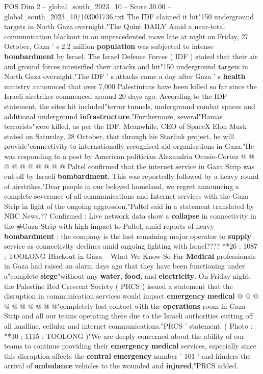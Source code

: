 \begin{textsample}{POS Dim 2 – global\_south\_2023\_10 – Score 30.00 – global\_south\_2023\_10/103001736.txt}  \label{ex:f2_pos_175}
The IDF claimed it hit"150 underground targets in North Gaza overnight."The Quint DAILY Amid a near-total communication blackout in an unprecedented move late at night on Friday, 27 October, Gaza ' s 2.2 million \textbf{population} was subjected to intense \textbf{bombardment} by Israel.
The Israel Defense Forces ( IDF ) stated that their air and ground forces intensified their attacks and hit"150 underground targets in North Gaza overnight."The IDF ' s attacks came a day after Gaza ' s \textbf{health} ministry announced that over 7,000 Palestinians have been killed so far since the Israeli airstrikes commenced around 20 days ago.
According to the IDF statement, the sites hit included"terror tunnels, underground combat spaces and additional underground \textbf{infrastructure}."Furthermore, several"Hamas terrorists"were killed, as per the IDF.
Meanwhile, CEO of SpaceX Elon Musk stated on Saturday, 28 October, that through his Starlink project, he will provide"connectivity to internationally recognised aid organisations in Gaza."He was responding to a post by American politician Alexandria Ocasio-Cortez @ @ @ @ @ @ @ @ @ @ Paltel confirmed that the internet service in Gaza Strip was cut off by Israeli \textbf{bombardment}.
This was reportedly followed by a heavy round of airstrikes."Dear people in our beloved homeland, we regret announcing a complete severance of all communications and Internet services with the Gaza Strip in light of the ongoing aggression,"Paltel said in a statement translated by NBC News.??
Confirmed : Live network data show a \textbf{collapse} in connectivity in the \#Gaza Strip with high impact to Paltel, amid reports of heavy \textbf{bombardment} ; the company is the last remaining major operator to \textbf{supply} service as connectivity declines amid ongoing fighting with Israel???? **26 ; 1087 ; TOOLONG Blackout in Gaza -- What We Know So Far \textbf{Medical} professionals in Gaza had raised an alarm days ago that they have been functioning under a"complete \textbf{siege}"without any \textbf{water}, \textbf{food}, and \textbf{electricity}.
On Friday night, the Palestine Red Crescent Society ( PRCS ) issued a statement that the disruption in communication services would impact \textbf{emergency} \textbf{medical} @ @ @ @ @ @ @ @ @ @"completely lost contact with the \textbf{operations} room in Gaza Strip and all our teams operating there due to the Israeli authorities cutting off all landline, cellular and internet communications."PRCS ' statement. ( Photo : **30 ; 1115 ; TOOLONG )"We are deeply concerned about the ability of our teams to continue providing their \textbf{emergency} \textbf{medical} services, especially since this disruption affects the \textbf{central} \textbf{emergency} number ' 101 ' and hinders the arrival of \textbf{ambulance} vehicles to the wounded and \textbf{injured},"PRCS added.

\end{textsample}
